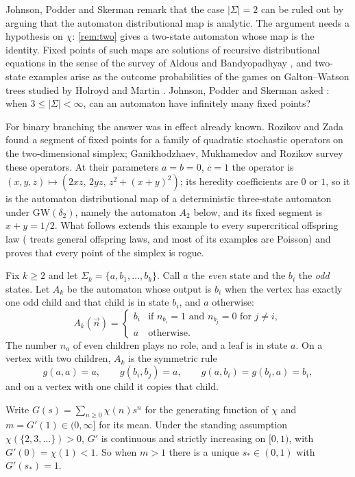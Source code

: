 \documentclass[11pt]{amsart}
\theoremstyle{remark}
\newcommand{\GW}{\mathrm{GW}}
\begin{document}
Johnson, Podder and Skerman remark that the case $|\Sigma|=2$ can be ruled out by arguing that the automaton distributional map is analytic. The argument needs a hypothesis on $\chi$: \cref{rem:two} gives a two-state automaton whose map is the identity. Fixed points of such maps are solutions of recursive distributional equations in the sense of the survey of Aldous and Bandyopadhyay \cite{AB}, and two-state examples arise as the outcome probabilities of the games on Galton--Watson trees studied by Holroyd and Martin \cite{HM}. Johnson, Podder and Skerman asked \cite[Section~6]{JPS}: when $3\le|\Sigma|<\infty$, can an automaton have infinitely many fixed points?

For binary branching the answer was in effect already known. Rozikov and Zada \cite[Theorem~2(iv) and equation~(21)]{RZ} found a segment of fixed points for a family of quadratic stochastic operators on the two-dimensional simplex; Ganikhodzhaev, Mukhamedov and Rozikov \cite{GMR} survey these operators. At their parameters $a=b=0$, $c=1$ the operator is $(x,y,z)\mapsto(2xz,\,2yz,\,z^2+(x+y)^2)$; its heredity coefficients are $0$ or $1$, so it is the automaton distributional map of a deterministic three-state automaton under $\GW(\delta_2)$, namely the automaton $A_2$ below, and its fixed segment is $x+y=1/2$. What follows extends this example to every supercritical offspring law (\cite{JPS} treats general offspring laws, and most of its examples are Poisson) and proves that every point of the simplex is rogue.

Fix $k\ge2$ and let $\Sigma_k=\{a,b_1,\dots,b_k\}$. Call $a$ the \emph{even} state and the $b_i$ the \emph{odd} states. Let $A_k$ be the automaton whose output is $b_i$ when the vertex has exactly one odd child and that child is in state $b_i$, and $a$ otherwise:
\[
A_k(\vec n)=\begin{cases} b_i & \text{if } n_{b_i}=1 \text{ and } n_{b_j}=0 \text{ for } j\ne i,\\ a & \text{otherwise.}\end{cases}
\]
The number $n_a$ of even children plays no role, and a leaf is in state $a$. On a vertex with two children, $A_k$ is the symmetric rule
\[
g(a,a)=a,\qquad g(b_i,b_j)=a,\qquad g(a,b_i)=g(b_i,a)=b_i ,
\]
and on a vertex with one child it copies that child.

Write $G(s)=\sum_{n\ge0}\chi(n)s^n$ for the generating function of $\chi$ and $m=G'(1)\in(0,\infty]$ for its mean. Under the standing assumption $\chi(\{2,3,\dots\})>0$, $G'$ is continuous and strictly increasing on $[0,1)$, with $G'(0)=\chi(1)<1$. So when $m>1$ there is a unique $s_*\in(0,1)$ with $G'(s_*)=1$.
\end{document}
